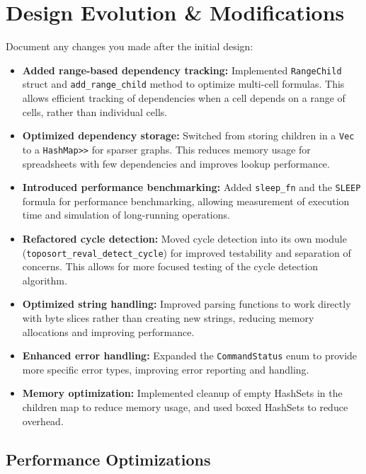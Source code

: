 \documentclass[11pt,a4paper]{article}
\begin{document}
\section{Design Evolution \& Modifications}
\label{sec:modifications}

Document any changes you made after the initial design:

\begin{itemize}
  \item \textbf{Added range-based dependency tracking:} Implemented \lstinline{RangeChild} struct and \lstinline{add_range_child} method to optimize multi-cell formulas. This allows efficient tracking of dependencies when a cell depends on a range of cells, rather than individual cells.
  
  \item \textbf{Optimized dependency storage:} Switched from storing children in a \lstinline{Vec} to a \lstinline{HashMap>>} for sparser graphs. This reduces memory usage for spreadsheets with few dependencies and improves lookup performance.
  
  \item \textbf{Introduced performance benchmarking:} Added \lstinline{sleep_fn} and the \lstinline{SLEEP} formula for performance benchmarking, allowing measurement of execution time and simulation of long-running operations.
  
  \item \textbf{Refactored cycle detection:} Moved cycle detection into its own module (\lstinline{toposort_reval_detect_cycle}) for improved testability and separation of concerns. This allows for more focused testing of the cycle detection algorithm.
  
  \item \textbf{Optimized string handling:} Improved parsing functions to work directly with byte slices rather than creating new strings, reducing memory allocations and improving performance.
  
  \item \textbf{Enhanced error handling:} Expanded the \lstinline{CommandStatus} enum to provide more specific error types, improving error reporting and handling.
  
  \item \textbf{Memory optimization:} Implemented cleanup of empty HashSets in the children map to reduce memory usage, and used boxed HashSets to reduce overhead.
\end{itemize}

\subsection{Performance Optimizations}
\end{document}
